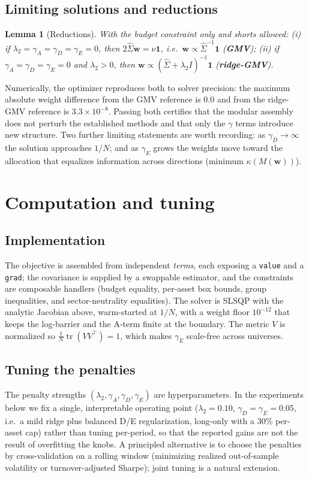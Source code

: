 \documentclass[11pt]{article}
\newcommand{\Sighat}{\hat\Sigma}
\newcommand{\tr}{\operatorname{tr}}
\newcommand{\one}{\mathbf{1}}
\newcommand{\w}{\mathbf{w}}
\newcommand{\M}{M(\w)}
\newtheorem{lemma}{Lemma}
\begin{document}
\subsection{Limiting solutions and reductions}
\label{sec:reductions}
\begin{lemma}[Reductions]
With the budget constraint only and shorts allowed:
(i) if $\lambda_2=\gamma_A=\gamma_D=\gamma_E=0$, then $2\Sighat\w=\nu\one$, i.e.\
$\w\propto\Sighat^{-1}\one$ (\textbf{GMV}); (ii) if
$\gamma_A=\gamma_D=\gamma_E=0$ and $\lambda_2>0$, then
$\w\propto(\Sighat+\lambda_2 I)^{-1}\one$ (\textbf{ridge-GMV}).
\end{lemma}
Numerically, the optimizer reproduces both to solver precision: the maximum
absolute weight difference from the GMV reference is $0.0$ and from the ridge-GMV
reference is $3.3\times10^{-8}$. Passing both certifies that the modular assembly
does not perturb the established methods and that only the $\gamma$ terms
introduce new structure. Two further limiting statements are worth recording: as
$\gamma_D\to\infty$ the solution approaches $1/N$; and as $\gamma_E$ grows the
weights move toward the allocation that equalizes information across directions
(minimum $\kappa(\M)$).

\section{Computation and tuning}
\subsection{Implementation}
The objective is assembled from independent \emph{terms}, each exposing a
\texttt{value} and a \texttt{grad}; the covariance is supplied by a swappable
estimator, and the constraints are composable handlers (budget equality,
per-asset box bounds, group inequalities, and sector-neutrality equalities). The
solver is SLSQP with the analytic Jacobian above, warm-started at $1/N$, with a
weight floor $10^{-12}$ that keeps the log-barrier and the A-term finite at the
boundary. The metric $V$ is normalized so $\tfrac1N\tr(VV^\top)=1$, which makes
$\gamma_E$ scale-free across universes.

\subsection{Tuning the penalties}
The penalty strengths $(\lambda_2,\gamma_A,\gamma_D,\gamma_E)$ are hyperparameters.
In the experiments below we fix a single, interpretable operating point
($\lambda_2=0.10$, $\gamma_D=\gamma_E=0.05$, i.e.\ a mild ridge plus balanced
D/E regularization, long-only with a $30\%$ per-asset cap) rather than tuning
per-period, so that the reported gains are not the result of overfitting the
knobs. A principled alternative is to choose the penalties by cross-validation on
a rolling window (minimizing realized out-of-sample volatility or turnover-adjusted
Sharpe); joint tuning is a natural extension.
\end{document}
